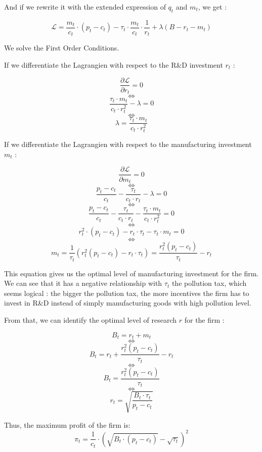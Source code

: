 \documentclass{article}
\begin{document}
And if we rewrite it with the extended expression of $q_{t}$ and $m_{t}$, we get : 

\begin{equation*}
    \mathcal{L} = \frac{m_{t}}{c_{t}}\cdot\left(p_{t}-c_{t}\right)-\tau_{t}\cdot \frac{m_{t}}{c_{t}}\cdot \frac{1}{r_{t}}+\lambda\left(B-r_{t}-m_{t}\right)
\end{equation*}

We solve the First Order Conditions.

If we differentiate the Lagrangien with respect to the R\&D investment $r_{t}$ :

$$\frac{\partial \mathcal{L}}{\partial r_{t}}=0$$
$$\iff$$
$$\frac{\tau_{t}\cdot m_{t}}{c_{t}\cdot r^{2}_{t}}-\lambda=0$$
$$\iff$$
$$\lambda=\frac{\tau_{t}\cdot m_{t}}{c_{t}\cdot r^{2}_{t}}$$

If we differentiate the Lagrangien with respect to the manufacturing investment $m_{t}$ :

$$\frac{\partial \mathcal{L}}{\partial m_{t}}=0$$
$$\iff$$
$$\frac{p_{t}-c_{t}}{c_{t}}-\frac{\tau_{t}}{c_{t}\cdot r_{t}}-\lambda=0$$
$$\iff$$
$$\frac{p_{t}-c_{t}}{c_{t}}-\frac{\tau_{t}}{c_{t}\cdot r_{t}}-\frac{\tau_{t}\cdot m_{t}}{c_{t}\cdot r^{2}_{t}}=0$$
$$\iff$$
$$r^{2}_{t}\cdot(p_{t}-c_{t})-r_{t}\cdot \tau_{t}-\tau_{t}\cdot m_{t}=0$$
$$\iff$$
\begin{equation}
    m_{t}=\frac{1}{\tau_{t}}\left(r_{t}^{2}(p_{t}-c_{t})-r_{t}\cdot \tau_{t}\right)=\frac{r_{t}^{2}\left(p_{t}-c_{t}\right)}{\tau_{t}}-r_{t}
\end{equation}

This equation gives us the optimal level of manufacturing investment for the firm. We can see that it has a negative relationship with $\tau_{t}$ the pollution tax, which seems logical : the bigger the pollution tax, the more incentives the firm has to invest in R\&D instead of simply manufacturing goods with high pollution level. 

From that, we can identify the optimal level of research $r$ for the firm :

$$B_{t}=r_{t}+m_{t}$$
$$\iff$$
$$B_{t}=r_{t}+\frac{r_{t}^{2}\left(p_{t}-c_{t}\right)}{\tau_{t}}-r_{t}$$
$$\iff$$
$$B_{t}=\frac{r_{t}^{2}\left(p_{t}-c_{t}\right)}{\tau_{t}}$$
$$\iff$$
\begin{equation}
    r_{t}=\sqrt{\frac{B_{t}\cdot \tau_{t}}{p_{t}-c_{t}}}
\end{equation}


Thus, the maximum profit of the firm is\footnotemark[1] : 
\begin{equation}
    \pi_{t}=\frac{1}{c_{t}}\cdot\left({\sqrt{B_{t}\cdot (p_{t}-c_{t})}-\sqrt{\tau_{t}}}\right)^{2}
\end{equation}
\end{document}
